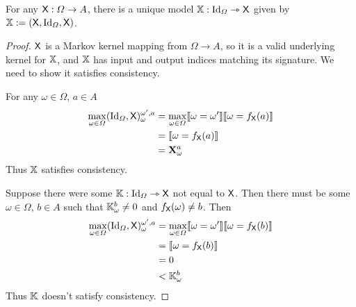\begin{lemma}\label{lem:uniq_model}
For any $\mathsf{X}:\Omega\to A$, there is a unique model $\mathbb{X}:\text{Id}_\Omega\rightarrowtriangle \mathsf{X}$ given by $\mathbb{X}:=(\mathsf{X},\text{Id}_\Omega,\mathsf{X})$.
\end{lemma}

\begin{proof}
$\mathsf{X}$ is a Markov kernel mapping from $\Omega\to A$, so it is a valid underlying kernel for $\mathbb{X}$, and $\mathbb{X}$ has input and output indices matching its signature. We need to show it satisfies consistency.

For any $\omega\in \Omega$, $a\in A$
\begin{align}
	\max_{\omega\in \Omega}(\text{Id}_\Omega,\mathsf{X})_{\omega}^{\omega',a} &= \max_{\omega\in \Omega} \llbracket \omega = \omega' \rrbracket \llbracket \omega = f_{\mathsf{X}}(a) \rrbracket\\
	&= \llbracket \omega = f_{\mathsf{X}}(a) \rrbracket\\
	&= \mathbf{X}_\omega^a
\end{align}
Thus $\mathbb{X}$ satisfies consistency.

Suppose there were some $\mathbb{K}:\text{Id}_\Omega\rightarrowtriangle \mathsf{X}$ not equal to $\mathsf{X}$. Then there must be some $\omega\in \Omega$, $b\in A$ such that $\mathbb{K}_\omega^b\neq 0$ and $f_{\mathsf{X}}(\omega)\neq b$. Then
\begin{align}
	\max_{\omega\in \Omega}(\text{Id}_\Omega,\mathsf{X})_{\omega}^{\omega',a} &= \max_{\omega\in \Omega} \llbracket \omega = \omega' \rrbracket \llbracket \omega = f_{\mathsf{X}}(b) \rrbracket\\
	&= \llbracket \omega = f_{\mathsf{X}}(b) \rrbracket\\
	&= 0\\
	&< \mathbb{K}_\omega^b
\end{align}
Thus $\mathbb{K}$ doesn't satisfy consistency.
\end{proof}



